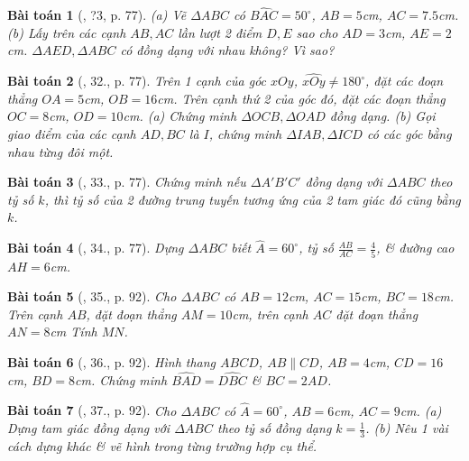 \documentclass{article}
\newtheorem{baitoan}{Bài toán}
\begin{document}
\begin{baitoan}[\cite{SGK_Toan_8_tap_2}, ?3, p. 77]
	(a) Vẽ $\Delta ABC$ có $\widehat{BAC} = 50^\circ$, $AB = 5$\emph{cm}, $AC = 7.5$\emph{cm}. (b) Lấy trên các cạnh $AB,AC$ lần lượt 2 điểm $D,E$ sao cho $AD = 3$\emph{cm}, $AE = 2$\emph{cm}. $\Delta AED,\Delta ABC$ có đồng dạng với nhau không? Vì sao?
\end{baitoan}

\begin{baitoan}[\cite{SGK_Toan_8_tap_2}, 32., p. 77]
	Trên 1 cạnh của góc $xOy$, $\widehat{xOy}\ne180^\circ$, đặt các đoạn thẳng $OA = 5$\emph{cm}, $OB = 16$\emph{cm}. Trên cạnh thứ 2 của góc đó, đặt các đoạn thẳng $OC = 8$\emph{cm}, $OD = 10$\emph{cm}. (a) Chứng minh $\Delta OCB,\Delta OAD$ đồng dạng. (b) Gọi giao điểm của các cạnh $AD,BC$ là $I$, chứng minh $\Delta IAB,\Delta ICD$ có các góc bằng nhau từng đôi một.
\end{baitoan}

\begin{baitoan}[\cite{SGK_Toan_8_tap_2}, 33., p. 77]
	Chứng minh nếu $\Delta A'B'C'$ đồng dạng với $\Delta ABC$ theo tỷ số $k$, thì tỷ số của 2 đường trung tuyến tương ứng của 2 tam giác đó cũng bằng $k$.
\end{baitoan}

\begin{baitoan}[\cite{SGK_Toan_8_tap_2}, 34., p. 77]
	Dựng $\Delta ABC$ biết $\widehat{A} = 60^\circ$, tỷ số $\frac{AB}{AC} = \frac{4}{5}$, \& đường cao $AH = 6$\emph{cm}.
\end{baitoan}

\begin{baitoan}[\cite{SBT_Toan_8_tap_2}, 35., p. 92]
	Cho $\Delta ABC$ có $AB = 12$\emph{cm}, $AC = 15$\emph{cm}, $BC = 18$\emph{cm}. Trên cạnh $AB$, đặt đoạn thẳng $AM = 10$\emph{cm}, trên cạnh $AC$ đặt đoạn thẳng $AN = 8$\emph{cm} Tính $MN$.
\end{baitoan}

\begin{baitoan}[\cite{SBT_Toan_8_tap_2}, 36., p. 92]
	Hình thang $ABCD$, $AB\parallel CD$, $AB = 4$\emph{cm}, $CD = 16$\emph{cm}, $BD = 8$\emph{cm}. Chứng minh $\widehat{BAD} = \widehat{DBC}$ \& $BC = 2AD$.
\end{baitoan}

\begin{baitoan}[\cite{SBT_Toan_8_tap_2}, 37., p. 92]
	Cho $\Delta ABC$ có $\widehat{A} = 60^\circ$, $AB = 6$\emph{cm}, $AC = 9$\emph{cm}. (a) Dựng tam giác đồng dạng với $\Delta ABC$ theo tỷ số đồng dạng $k = \frac{1}{3}$. (b) Nêu 1 vài cách dựng khác \& vẽ hình trong từng trường hợp cụ thể.
\end{baitoan}
\end{document}
